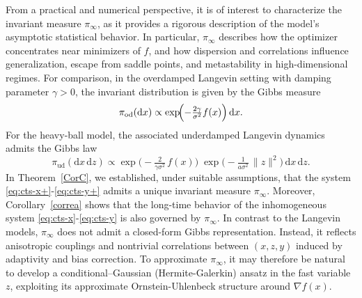 \documentclass[11pt, a4paper,leqno]{amsart}
\theoremstyle{definition}
\numberwithin{equation}{section}
\begin{document}
From a practical and numerical perspective, it is of interest to characterize the invariant measure $\pi_\infty$, as it provides a rigorous description of the model’s asymptotic statistical behavior. In particular, $\pi_\infty$ describes how the optimizer concentrates near minimizers of $f$, and how dispersion and correlations influence generalization, escape from saddle points, and metastability in high-dimensional regimes. For comparison, in the overdamped Langevin setting with damping parameter $\gamma>0$, the invariant distribution is given by the Gibbs measure
\[
\pi_{\mathrm{od}}(\mathrm{d}x)\propto\exp\!\Bigl(-\tfrac{2\gamma}{\sigma^2}f(x)\Bigr)\,\mathrm{d}x.
\]
For the heavy-ball model, the associated underdamped Langevin dynamics admits the Gibbs law
\[
\pi_{\mathrm{ud}}(\mathrm{d}x\,\mathrm{d}z)\propto \exp\!\Big(-\tfrac{2}{\gamma\sigma^2}\,f(x)\Big)\;
\exp\!\Big(-\tfrac{1}{a\sigma^2}\,\|z\|^2\Big)\,\mathrm{d}x\,\mathrm{d}z.
\]
In Theorem~\ref{CorC}, we established, under suitable assumptions, that the system \eqref{eq:cts-x+}-\eqref{eq:cts-y+} admits a unique invariant measure $\pi_\infty$. Moreover, Corollary~\ref{correa} shows that the long-time behavior of the inhomogeneous system \eqref{eq:cts-x}-\eqref{eq:cts-y} is also governed by $\pi_\infty$. In contrast to the Langevin models, $\pi_\infty$ does not admit a closed-form Gibbs representation. Instead, it reflects anisotropic couplings and nontrivial correlations between $(x,z,y)$ induced by adaptivity and bias correction. To approximate $\pi_\infty$, it may therefore be natural to develop a conditional–Gaussian (Hermite-Galerkin) ansatz in the fast variable $z$, exploiting its approximate Ornstein-Uhlenbeck structure around $\nabla f(x)$.
\end{document}
